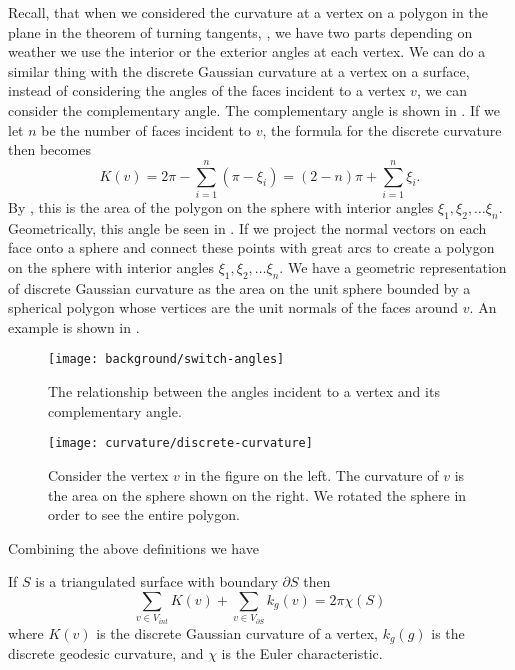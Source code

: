 Recall, that when we considered the curvature at a vertex on a polygon in the plane
in the theorem of turning tangents, , we have two parts depending on
weather we use the interior or the exterior angles at each vertex.
We can do a similar thing with the discrete Gaussian curvature at a vertex on a surface,
instead of considering the angles of the faces incident to a vertex $v$, we can consider
the complementary angle. The complementary angle is shown in . 
If we let $n$ be the number of faces
incident to $v$, the formula for the discrete curvature then becomes
\begin{equation}\label{eqn:discrete-curvature-complement-angle}
K(v)=2\pi - \sum_{i=1}^n (\pi - \xi_i)=(2-n)\pi +\sum_{i=1}^n \xi_i.
\end{equation}
By , this is the area of the polygon on the sphere with interior
angles $\xi_1, \xi_2,\ldots \xi_n.$
Geometrically, this angle be seen in .
If we project the normal vectors on each face onto a sphere and
connect these points with great arcs to create a polygon on the sphere with interior angles
$\xi_1, \xi_2,\ldots \xi_n.$
We have a geometric representation of discrete
Gaussian curvature as the area on the unit 
sphere bounded by a spherical polygon whose vertices are the unit normals of 
the faces around $v$. An example is shown in .

\begin{figure}[htb]
\centering
\texttt{[image: background/switch-angles]}
\caption{The relationship between the angles incident to a vertex and
its complementary angle.}
\label{fig:switcheroo}
\end{figure}





\begin{figure}[htb]
\centering
\texttt{[image: curvature/discrete-curvature]}
\caption{Consider the vertex $v$ in the figure on the left. The curvature of $v$
is the area on the sphere shown on the right. We rotated the sphere
in order to see the entire polygon.}
\label{fig:discrete-curvature}
\end{figure}







Combining the above definitions  we have

\begin{theorem} \label{thm:g-b-d}

If $S$ is a triangulated surface with  boundary $\partial S$ then
$$\sum_{v\in V_{int}} K(v) + \sum_{v\in V_{\partial S}} k_g(v) = 2\pi \chi(S)$$
where $K(v)$ is the discrete Gaussian curvature
of a vertex, $k_g(g)$ is the discrete geodesic curvature,  and
$\chi$ is the Euler characteristic.
\end{theorem}





